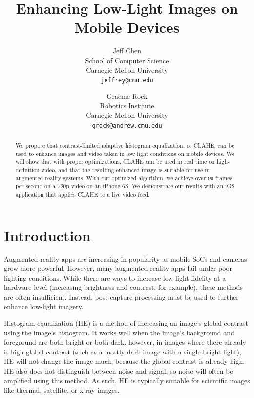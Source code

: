 \documentclass[10pt,twocolumn,letterpaper]{article}
\begin{document}
\title{Enhancing Low-Light Images on Mobile Devices}

\author{Jeff Chen\\
School of Computer Science\\
Carnegie Mellon University\\
{\tt\small jeffrey@cmu.edu}
\and
Graeme Rock\\
Robotics Institute\\
Carnegie Mellon University\\
{\tt\small grock@andrew.cmu.edu}
}

\maketitle

\begin{abstract}
   We propose that contrast-limited adaptive histogram equalization, or CLAHE, can be used to enhance images and video taken in low-light conditions on mobile devices. We will show that with proper optimizations, CLAHE can be used in real time on high-definition video, and that the resulting enhanced image is suitable for use in augmented-reality systems. With our optimized algorithm, we achieve over 90 frames per second on a 720p video on an iPhone 6S. We demonstrate our results with an iOS application that applies CLAHE to a live video feed.
\end{abstract}

\section{Introduction}

Augmented reality apps are increasing in popularity as mobile SoCs and cameras grow more powerful. However, many augmented reality apps fail under poor lighting conditions. While there are ways to increase low-light fidelity at a hardware level (increasing brightness and contrast, for example), these methods are often insufficient. Instead, post-capture processing must be used to further enhance low-light imagery.

Histogram equalization (HE) is a method of increasing an image's global contrast using the image's histogram. It works well when the image's background and foreground are both bright or both dark. however, in images where there already is high global contrast (such as a mostly dark image with a single bright light), HE will not change the image much, because the global contrast is already high. HE also does not distinguish between noise and signal, so noise will often be amplified using this method. As such, HE is typically suitable for scientific images like thermal, satellite, or x-ray images.
\end{document}
